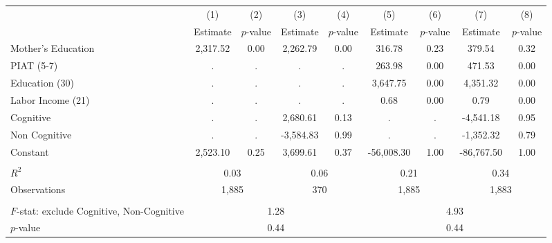 \begin{tabular}{lcccccccc} \toprule
 & (1) & (2) & (3) & (4) & (5) & (6) & (7) & (8) \\
 & Estimate & $p$-value & Estimate & $p$-value  & Estimate & $p$-value  & Estimate & $p$-value  \\ \midrule 
Mother's Education &     2,317.52 &         0.00 &     2,262.79 &         0.00 &       316.78 &         0.23 &       379.54 &         0.32 \\  
PIAT (5-7) &            . &            . &            . &            . &       263.98 &         0.00 &       471.53 &         0.00 \\  
Education (30) &            . &            . &            . &            . &     3,647.75 &         0.00 &     4,351.32 &         0.00 \\  
Labor Income (21) &            . &            . &            . &            . &         0.68 &         0.00 &         0.79 &         0.00 \\  
Cognitive &            . &            . &     2,680.61 &         0.13 &            . &            . &    -4,541.18 &         0.95 \\  
Non Cognitive &            . &            . &    -3,584.83 &         0.99 &            . &            . &    -1,352.32 &         0.79 \\  
Constant &     2,523.10 &         0.25 &     3,699.61 &         0.37 &   -56,008.30 &         1.00 &   -86,767.50 &         1.00 \\ \\ \midrule
$R^2$ &         \multicolumn{2}{c}{0.03} &              \multicolumn{2}{c}{0.06} &               \multicolumn{2}{c}{0.21} &                \multicolumn{2}{c}{0.34}  \\  
Observations &       \multicolumn{2}{c}{1,885} &            \multicolumn{2}{c}{370} &           \multicolumn{2}{c}{1,885} &          \multicolumn{2}{c}{1,883}   \\  \\ \midrule
$F$-stat: exclude Cognitive, Non-Cognitive &                      \multicolumn{4}{c}{1.28} &                      \multicolumn{4}{c}{4.93}   \\  
$p$-value &             \multicolumn{4}{c}{0.44} &                  \multicolumn{4}{c}{0.44}  \\    \bottomrule \end{tabular}
